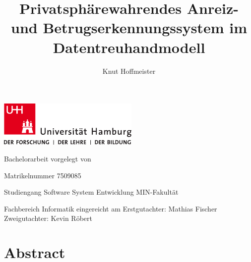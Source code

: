 \documentclass{scrreprt}
\begin{document}
\title{Privatsphärewahrendes Anreiz- und Betrugserkennungssystem im\\ Datentreuhandmodell}
\author{Knut Hoffmeister}

\begin{titlepage}
\includegraphics[width=6.8cm]{up-uhh-logo-u-2010-u-farbe-u-rgb.pdf}
\begin{center}
    \vfill
    \Large Bachelorarbeit
    \vfill
    \makeatletter
    {\Large\textsf{\textbf{\@title}}}
    \makeatother
    \vfill
    vorgelegt von
    \par\bigskip
    \makeatletter
    {\@author}
    \makeatother
    \par
    Matrikelnummer 7509085 \par
    Studiengang Software System Entwicklung
    \vfill
    MIN-Fakultät \par
    Fachbereich Informatik
    \vfill
    \makeatletter
    eingereicht am {\@date}
    \makeatother
    \vfill
    Erstgutachter: Mathias Fischer\\
    Zweigutachter: Kevin Röbert
\end{center}
\end{titlepage}

\restoregeometry

\tableofcontents


\chapter*{Abstract}


\end{document}
